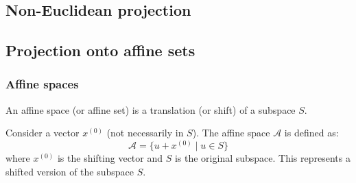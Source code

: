 \subsection{Non-Euclidean projection}
\subsection{Projection onto affine sets}
        \subsubsection{Affine spaces}
        \begin{definition}
            An affine space (or affine set) is a translation (or shift) of a subspace $S$.
        \end{definition}

        \begin{example}
            Consider a vector $x^{(0)}$ (not necessarily in $S$). The affine space $\mathcal{A}$ is defined as:
            \[
            \mathcal{A} = \{ u + x^{(0)} \mid u \in S \}
            \]
            where $x^{(0)}$ is the shifting vector and $S$ is the original subspace. This represents a shifted version of the subspace $S$.

        \end{example}

